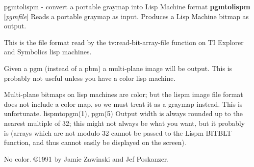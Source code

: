 %

\newpage
%

pgmtolispm - convert a portable graymap into Lisp Machine format
{\bf pgmtolispm}
{\rm [}{\it pgmfile}{\rm ]}
Reads a portable graymap as input.
Produces a Lisp Machine bitmap as output.
\par
This is the file format read by the tv:read-bit-array-file function on
TI Explorer and Symbolics lisp machines.
\par
Given a pgm (instead of a pbm) a multi-plane image will be output.
This is probably not useful unless you have a color lisp machine.
\par
Multi-plane bitmaps on lisp machines are color; but the lispm image file
format does not include a color map, so we must treat it as a graymap 
instead.  This is unfortunate.
lispmtopgm(1), pgm(5)
Output width is always rounded up to the nearest multiple of 32; this might 
not always be what you want, but it probably is (arrays which are not 
modulo 32 cannot be passed to the Lispm BITBLT function, and thus cannot 
easily be displayed on the screen).
\par
No color.
\copyright 1991 by Jamie Zawinski and Jef Poskanzer.
%
 
%

